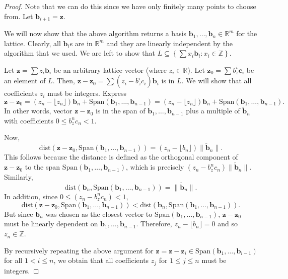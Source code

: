 \begin{proof}
Note that we can do this since we have only finitely many points to choose from. Let \(\mathbf{b}_{i+1} = \mathbf{z}\).

We will now show that the above algorithm returns a basis \(\mathbf{b}_1, \ldots, \mathbf{b}_n \in \mathbb{R}^m\) for the lattice. Clearly, all \(\mathbf{b}_i\)s are in \(\mathbb{R}^m\) and they are linearly independent by the algorithm that we used. We are left to show that \(L \subseteq \left\{ \sum x_i \mathbf{b}_i : x_i \in \mathbb{Z} \right\}\).

Let \(\mathbf{z} = \sum z_i \mathbf{b}_i\) be an arbitrary lattice vector (where \(z_i \in \mathbb{R}\)). Let \(\mathbf{z}_0 = \sum b_z^i \mathbf{c}_i\) be an element of \(L\). Then, \(\mathbf{z} - \mathbf{z}_0 = \sum (z_i - b_z^i c_i) \mathbf{b}_i\) is in \(L\). We will show that all coefficients \(z_i\) must be integers. Express 
$$
\mathbf{z} - \mathbf{z}_0 = (z_n - \lfloor z_n \rfloor) \mathbf{b}_n + \text{Span}(\mathbf{b}_1, \ldots, \mathbf{b}_{n-1}) = (z_n - \lfloor z_n \rfloor) \mathbf{b}_n + \text{Span}(\mathbf{b}_1, \ldots, \mathbf{b}_{n-1}).
$$
In other words, vector \(\mathbf{z} - \mathbf{z}_0\) is in the span of \(\mathbf{b}_1, \ldots, \mathbf{b}_{n-1}\) plus a multiple of \(\tilde{\mathbf{b}}_n\) with coefficients \(0 \leq b_z^n c_n < 1\).

Now,
\[
\text{dist}(\mathbf{z} - \mathbf{z}_0, \text{Span}(\mathbf{b}_1, \ldots, \mathbf{b}_{n-1})) = (z_n - \lfloor b_n \rfloor) \|\tilde{\mathbf{b}}_n\|.
\]
This follows because the distance is defined as the orthogonal component of \(\mathbf{z} - \mathbf{z}_0\) to the span \(\text{Span}(\mathbf{b}_1, \ldots, \mathbf{b}_{n-1})\), which is precisely \((z_n - b_z^n c_n) \|\tilde{\mathbf{b}}_n\|\). Similarly,
\[
\text{dist}(\mathbf{b}_n, \text{Span}(\mathbf{b}_1, \ldots, \mathbf{b}_{n-1})) = \|\tilde{\mathbf{b}}_n\|.
\]
In addition, since \(0 \leq (z_n - b_z^n c_n) < 1\),
\[
\text{dist}(\mathbf{z} - \mathbf{z}_0, \text{Span}(\mathbf{b}_1, \ldots, \mathbf{b}_{n-1})) < \text{dist}(\mathbf{b}_n, \text{Span}(\mathbf{b}_1, \ldots, \mathbf{b}_{n-1})).
\]
But since \(\mathbf{b}_n\) was chosen as the closest vector to \(\text{Span}(\mathbf{b}_1, \ldots, \mathbf{b}_{n-1})\), \(\mathbf{z} - \mathbf{z}_0\) must be linearly dependent on \(\mathbf{b}_1, \ldots, \mathbf{b}_{n-1}\). Therefore, \(z_n - \lfloor b_n \rfloor= 0\) and so \(z_n \in \mathbb{Z}\).

By recursively repeating the above argument for \(\mathbf{z} = \mathbf{z} - \mathbf{z}_i \in \text{Span}(\mathbf{b}_1, \ldots, \mathbf{b}_{i-1})\) for all \(1 < i \leq n\), we obtain that all coefficients \(z_j\) for \(1 \leq j \leq n\) must be integers.

\end{proof}